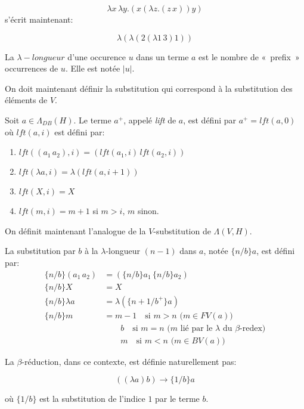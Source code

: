 \[ \lambda x \, \lambda y . (x ( \lambda z . (z \, x)) y) \] 
s’écrit maintenant:

\[ \lambda ( \lambda (2 (\lambda 1 \, 3) 1 )) \]

\begin{defn}
La $\lambda-longueur$ d’une occurence $u$ dans un terme $a$ est le nombre de « prefix » occurrences de $u$. Elle est notée $|u|$.
\end{defn}

On doit maintenant définir la substitution qui correspond à la substitution des éléments de $V$.

\begin{defn}
Soit $a \in \Lambda_{DB}(H)$. Le terme $a^{+}$, appelé \textit{lift} de $a$, est défini par $a^{+} = lft(a,0)$ où $lft(a,i)$ est défini par:
\begin{enumerate}
    \item $lft((a_1 \, a_2),i) = (lft(a_1,i) \, lft(a_2,i))$
    \item $lft(\lambda a, i) = \lambda (lft(a,i+1))$
    \item $lft(X,i) = X$
    \item $lft(m,i) = m + 1$ si $m > i$, $m$ sinon.
\end{enumerate}
\end{defn}

On définit maintenant l’analogue de la $V$-substitution de $\Lambda(V,H)$.

\begin{defn}
La substitution par $b$ à la $\lambda$-longueur $(n-1)$ dans $a$, notée $\{n/b\}a$, est défini par:
\begin{align*}
\{n/b\}(a_1 \, a_2) &= (\{n/b\} a_1 \, \{n/b\} a_2) \\
\{n/b\} X &= X \\
\{n/b\} \lambda a &= \lambda (\{n+1/b^{+}\} a) \\
\{n/b\} m &= m-1 \quad \text{si $m > n$ ($m \in FV(a)$)} \\
&\quad \quad b \quad \text{si $m=n$ ($m$ lié par le $\lambda$ du $\beta$-redex)} \\
&\quad \quad m \quad \text{si $m < n$ ($m \in BV(a)$)}
\end{align*}
\end{defn}

\begin{defn}
La $\beta$-réduction, dans ce contexte, est définie naturellement pas:

\[ ((\lambda a)b) \xrightarrow{}{\{1/b\}} a \]

où $\{1/b\}$ est la substitution de l’indice $1$ par le terme $b$.
\end{defn}

